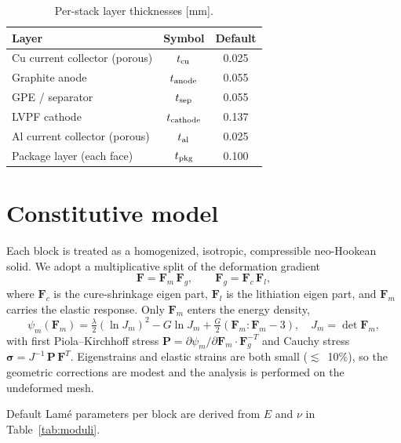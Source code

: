 \documentclass[11pt,letterpaper]{article}
\begin{document}
\begin{table}[H]
\centering
\caption{Per-stack layer thicknesses [mm].}
\label{tab:geom}
\begin{tabular}{lcc}
\toprule
Layer & Symbol & Default \\
\midrule
Cu current collector (porous) & $t_{\rm cu}$       & 0.025 \\
Graphite anode                & $t_{\rm anode}$    & 0.055 \\
GPE / separator               & $t_{\rm sep}$      & 0.055 \\
LVPF cathode                  & $t_{\rm cathode}$  & 0.137 \\
Al current collector (porous) & $t_{\rm al}$       & 0.025 \\
Package layer (each face)     & $t_{\rm pkg}$      & 0.100 \\
\bottomrule
\end{tabular}
\end{table}

\section{Constitutive model}

Each block is treated as a homogenized, isotropic, compressible
neo-Hookean solid.  We adopt a multiplicative split of the deformation
gradient
\begin{equation}
\mathbf{F} = \mathbf{F}_m \, \mathbf{F}_g, \qquad
\mathbf{F}_g = \mathbf{F}_c \, \mathbf{F}_l ,
\label{eq:multi-split}
\end{equation}
where $\mathbf{F}_c$ is the cure-shrinkage eigen part, $\mathbf{F}_l$
is the lithiation eigen part, and $\mathbf{F}_m$ carries the elastic
response.  Only $\mathbf{F}_m$ enters the energy density,
\begin{equation}
\psi_m(\mathbf{F}_m) = \tfrac{\lambda}{2}(\ln J_m)^2 - G \ln J_m
+ \tfrac{G}{2}(\mathbf{F}_m\!:\!\mathbf{F}_m - 3),
\quad J_m = \det \mathbf{F}_m,
\end{equation}
with first Piola--Kirchhoff stress $\mathbf{P} = \partial
\psi_m/\partial \mathbf{F}_m \cdot \mathbf{F}_g^{-T}$ and Cauchy stress
$\bm{\sigma} = J^{-1}\,\mathbf{P}\,\mathbf{F}^T$.  Eigenstrains and
elastic strains are both small ($\lesssim$~10\%), so the geometric
corrections are modest and the analysis is performed on the undeformed
mesh.

Default Lam\'e parameters per block are derived from $E$ and $\nu$ in
Table~\ref{tab:moduli}.
\end{document}

